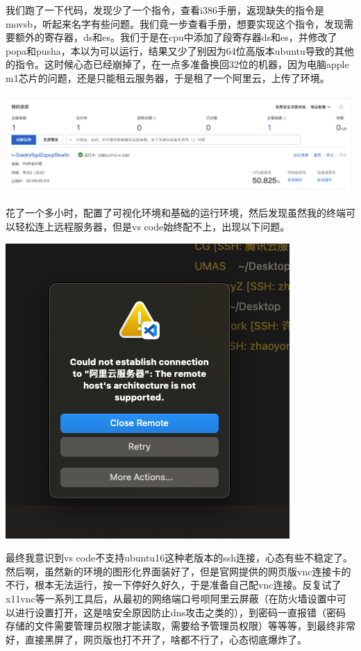 \documentclass[UTF8,a4paper,10pt]{ctexart}
\begin{document}
我们跑了一下代码，发现少了一个指令，查看i386手册，返现缺失的指令是movsb，听起来名字有些问题。我们竟一步查看手册，想要实现这个指令，发现需要额外的寄存器，ds和es。我们于是在cpu中添加了段寄存器ds和es，并修改了popa和pusha，本以为可以运行，结果又少了别因为64位高版本ubuntu导致的其他的指令。这时候心态已经崩掉了，在一点多准备换回32位的机器，因为电脑apple m1芯片的问题，还是只能租云服务器，于是租了一个阿里云，上传了环境。
\begin{center}
  \includegraphics*[scale = 0.3]{pic/fuq}
\end{center}
花了一个多小时，配置了可视化环境和基础的运行环境，然后发现虽然我的终端可以轻松连上远程服务器，但是vs code始终配不上，出现以下问题。
\begin{center}
  \includegraphics*[scale = 0.3]{pic/hhh}
\end{center}
最终我意识到vs code不支持ubuntu16这种老版本的ssh连接，心态有些不稳定了。然后啊，虽然新的环境的图形化界面装好了，但是官网提供的网页版vnc连接卡的不行，根本无法运行，按一下停好久好久，于是准备自己配vnc连接。反复试了x11vnc等一系列工具后，从最初的网络端口号呗阿里云屏蔽（在防火墙设置中可以进行设置打开，这是啥安全原因防止dns攻击之类的），到密码一直报错（密码存储的文件需要管理员权限才能读取，需要给予管理员权限）等等等，到最终非常好，直接黑屏了，网页版也打不开了，啥都不行了，心态彻底爆炸了。
\end{document}
